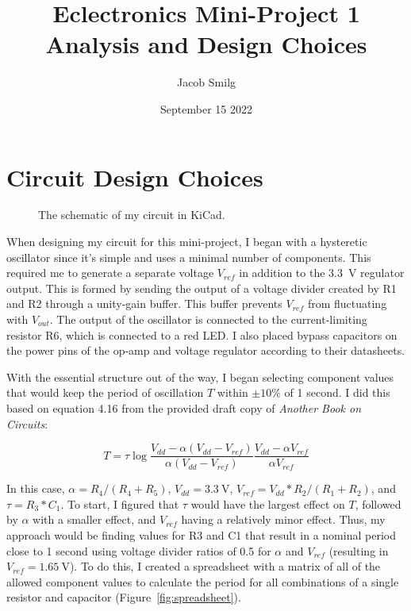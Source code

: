 \documentclass{article}
\title{Eclectronics Mini-Project 1 Analysis and Design Choices}
\author{Jacob Smilg}
\date{September 15 2022}
\begin{document}
\maketitle

\section{Circuit Design Choices}

\begin{figure}[!ht]
    \centering
    
    \caption{The schematic of my circuit in KiCad.}
    \label{fig:kicad_schem}
\end{figure}

When designing my circuit for this mini-project, I began with a hysteretic oscillator since it's simple and uses a minimal number of components. This required me to generate a separate voltage \(V_{ref}\) in addition to the \qty{3.3}{\volt} regulator output. This is formed by sending the output of a voltage divider created by R1 and R2 through a unity-gain buffer. This buffer prevents \(V_{ref}\) from fluctuating with \(V_{out}\). The output of the oscillator is connected to the current-limiting resistor R6, which is connected to a red LED. I also placed bypass capacitors on the power pins of the op-amp and voltage regulator according to their datasheets.

With the essential structure out of the way, I began selecting component values that would keep the period of oscillation \(T\) within \(\pm10\%\) of 1 second. I did this based on equation 4.16 from the provided draft copy of \textit{Another Book on Circuits}:

\begin{equation}
    T=\tau\log\frac{V_{dd}-\alpha\left(V_{dd}-V_{ref}\right)}{\alpha\left(V_{dd}-V_{ref}\right)}\frac{V_{dd}-\alpha V_{ref}}{\alpha V_{ref}}
    \label{eq:period}
\end{equation}

In this case, \(\alpha=R_4/\left(R_4+R_5\right)\), \(V_{dd}=\qty{3.3}{\volt}\), \(V_{ref}=V_{dd}*R_2/\left(R_1+R_2\right)\), and \(\tau=R_3*C_1\). To start, I figured that \(\tau\) would have the largest effect on \(T\), followed by \(\alpha\) with a smaller effect, and \(V_{ref}\) having a relatively minor effect. Thus, my approach would be finding values for R3 and C1 that result in a nominal period close to 1 second using voltage divider ratios of 0.5 for \(\alpha\) and \(V_{ref}\) (resulting in \(V_{ref}=\qty{1.65}{\volt}\)). To do this, I created a spreadsheet with a matrix of all of the allowed component values to calculate the period for all combinations of a single resistor and capacitor (Figure~\ref{fig:spreadsheet}). 
\end{document}

